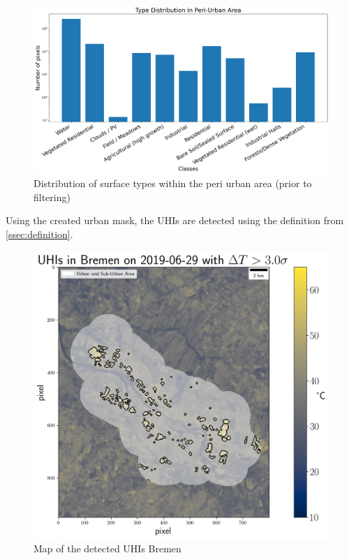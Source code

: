 \documentclass[12pt,a4paper, english,twoside]{article}
\begin{document}
        \begin{figure}[!htbp]
         \centering
         \includegraphics[width=\textwidth]{img/ClassDistributionPU.png}
         \caption{Distribution of surface types within the peri urban area (prior to filtering)}\label{fig:classesPeri}
        \end{figure}
        Using the created urban mask, the UHIs are detected using the definition from \cref{ssec:definition}.
       \begin{figure}[!hbtp]
          \includegraphics[width=\textwidth]{img/UHIs_Bremen_2019-06-29_s:3}
         \caption{Map of the detected UHIs Bremen}\label{fig:uhisHB2019}
       \end{figure}
\end{document}
